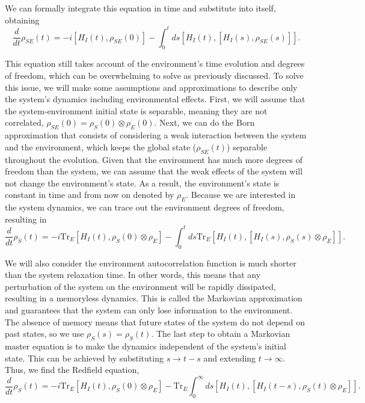 \noindent We can formally integrate this equation in time and substitute into itself, obtaining
\begin{equation}
    \frac{d}{dt}{\rho}_{SE}(t) = -i [{H}_I(t), {\rho}_{SE}(0)] - \int_{0}^{t} ds [{H}_I(t), [{H}_I(s), {\rho}_{SE}(s)]].
\end{equation}

\noindent This equation still takes account of the environment's time evolution and degrees of freedom, which can be overwhelming to solve as previously discussed. To solve this issue, we will make some assumptions and approximations to describe only the system's dynamics including environmental effects. First, we will assume that the system-environment initial state is separable, meaning they are not correlated, ${\rho}_{SE} (0) = {\rho}_S (0) \otimes {\rho}_E (0)$. Next, we can do the Born approximation that consists of considering a weak interaction between the system and the environment, which keeps the global state (${\rho}_{SE} (t)$) separable throughout the evolution. Given that the environment has much more degrees of freedom than the system, we can assume that the weak effects of the system will not change the environment's state. As a result, the environment's state is constant in time and from now on denoted by ${\rho}_E$. Because we are interested in the system dynamics, we can trace out the environment degrees of freedom, resulting in
\begin{equation}
    \frac{d}{dt} {\rho}_{S}(t) = -i \text{Tr}_E[{H}_I(t), {\rho}_S (0) \otimes {\rho}_E] - \int_{0}^{t} ds \text{Tr}_E[{H}_I(t), [{H}_I(s), {\rho}_S (s) \otimes {\rho}_E]].
\end{equation}

\noindent We will also consider the environment autocorrelation function is much shorter than the system relaxation time. In other words, this means that any perturbation of the system on the environment will be rapidly dissipated, resulting in a memoryless dynamics. This is called the Markovian approximation and guarantees that the system can only lose information to the environment. The absence of memory means that future states of the system do not depend on past states, so we use $\rho_S(s) = \rho_S(t)$. The last step to obtain a Markovian master equation is to make the dynamics independent of the system's initial state. This can be achieved by substituting $s \rightarrow t-s$ and extending $t \rightarrow \infty$. Thus, we find the Redfield equation,
\begin{equation}
    \frac{d}{dt} {\rho}_{S}(t) = -i \text{Tr}_E[{H}_I(t), {\rho}_S (0) \otimes {\rho}_E] - \text{Tr}_E\int_{0}^{\infty} ds [{H}_I(t), [{H}_I(t-s), {\rho}_S (t) \otimes {\rho}_E]].
    \label{eq:redfield}
\end{equation}

